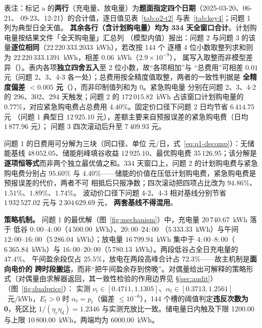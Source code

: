 表注：标记 a 的\textbf{两行}（充电量、放电量）为\textbf{题面指定四个日期}（2025-03-20、06-21、
09-23、12-21）的合计值，逐日值见表~\ref{tab:q2-t2} 与表~\ref{tab:key4}；问题 1 列为典型日全天值。
\textbf{其余各行（含计划购电量）均为 334 天全窗口合计}。计划购电量按结果文件「全天购电量」汇总列
（模型内值）报出：问题 2 与问题 3 的该量\textbf{逐位相同}（\(22\,220\,333.2033\)~kWh），若改按 144 个
逐槽 4 位小数取整列求和则为 \(22\,220\,333.1391\)~kWh，相差 \(0.06\)~kWh（\(2.9\times10^{-9}\)），
属写入取整而非模型差异（）。表内各项\textbf{独立四舍五入}至 2 位小数，故“各项相加”与
“总费用”可相差 \(0.01\) 元（问题 2、3、4-3 各一处）；总费用按全精度值取整，两者的一致性判据是
\textbf{全精度偏差 \(<0.005\) 元}（），而非印制值列和为 0。紧急购电量 
分别在问题 2、3、4-2 的 296、302、294 天触发；问题 2 的 \(172\,015.82\)~kWh 占该窗口计划购电量的
\(0.77\%\)，对应紧急购电费占总费用 \(4.40\%\)。固定价口径下问题 2 日均节省 \(6\,414.75\) 元
（问题 1 典型日 \(12\,925.10\) 元），差额主要来自预报误差的紧急购电费（日均 \(1\,877.96\) 元）；
问题 3 四次滚动后升至 \(7\,409.93\) 元。

问题 1 的日费用可分解为三块（同口径、单位 元/日，式~\eqref{eq:q1-decomp}）：无储能基线
\(48\,052.05\)、储能削峰填谷收益 \(12\,925.10\)、最优购电费 \(35\,126.95\)；该分解是
\textbf{逐项恒等式}而非两个独立最优值之和。334 天窗口上，问题 2 的计划购电费与紧急购电费分别占
\(95.60\%\) 与 \(4.40\%\)——储能的价值在压低计划购电费，紧急购电费是预报误差的代价，两者不可
相抵后只报净数；四次滚动把四项占比改为 \(94.86\%\)、\(1.51\%\)、\(1.89\%\)、\(1.74\%\)。
波动价口径下问题 4-2、4-3 相对基线分别节省 \(1\,932\,527.02\) 元与 \(2\,304\,629.69\) 元，
\textbf{两套基线不得混用}。

\textbf{策略机制。} 问题 1 的最优解（图~\ref{fig:mechanism}）中，充电量 \(20\,740.67\)~kWh 落于
低谷 \(0{:}00\)--\(4{:}00\)（\(4\,500.00\)~kWh）、\(20{:}00\)--\(24{:}00\)
（\(5\,333.33\)~kWh）与午间 \(12{:}00\)--\(16{:}00\)（\(5\,286.04\)~kWh）；放电量
\(16\,799.94\)~kWh 集中于 \(4{:}00\)--\(8{:}00\)（\(6\,365.84\)~kWh）与
\(16{:}00\)--\(20{:}00\)（\(5\,780.13\)~kWh）。两段低谷占全日充电量的 \(47.4\%\)、
午间盈余段仅占 \(25.5\%\)，放电在两段高峰合计占 \(72.3\%\)——故主机制是\textbf{面向电价的
跨时段搬运}，而非“把午间盈余存到傍晚”。对偶量给出可解释的策略形式（对偶量由求解器返回，其一致性检验的作用边界见 \S\ref{sec:audit}）（图~\ref{fig:dualprice}）：
实测 \(\nu_t\in[0.4711,1.1305]\)、\(\alpha_t\in[0.3713,1.2561]\)~元/kWh，\(E_t>0\) 时
\(\alpha_t=p_t\)（偏差 \(\le10^{-6}\)），144 个槽的阈值判定\textbf{违反次数为 0}，死区比
\(1/(\eta_c\eta_d)=1.2346\) 与实测充放比一致。储电量日内触及下限 1200.00 与上限
10\,800.00~kWh，两端均为 6000.00~kWh。

